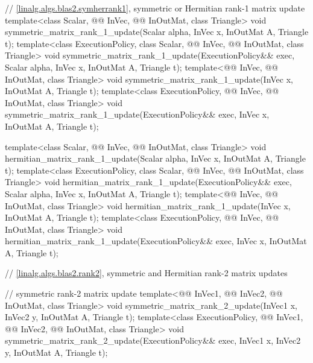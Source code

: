 \begin{codeblock}
{  // \ref{linalg.algs.blas2.symherrank1}, symmetric or Hermitian rank-1 matrix update
  template<class Scalar, @@ InVec, @@ InOutMat, class Triangle>
    void symmetric_matrix_rank_1_update(Scalar alpha, InVec x, InOutMat A, Triangle t);
  template<class ExecutionPolicy,
           class Scalar, @@ InVec, @@ InOutMat, class Triangle>
    void symmetric_matrix_rank_1_update(ExecutionPolicy&& exec,
                                        Scalar alpha, InVec x, InOutMat A, Triangle t);
  template<@@ InVec, @@ InOutMat, class Triangle>
    void symmetric_matrix_rank_1_update(InVec x, InOutMat A, Triangle t);
  template<class ExecutionPolicy,
           @@ InVec, @@ InOutMat, class Triangle>
    void symmetric_matrix_rank_1_update(ExecutionPolicy&& exec,
                                        InVec x, InOutMat A, Triangle t);

  template<class Scalar, @@ InVec, @@ InOutMat, class Triangle>
    void hermitian_matrix_rank_1_update(Scalar alpha, InVec x, InOutMat A, Triangle t);
  template<class ExecutionPolicy,
           class Scalar, @@ InVec, @@ InOutMat, class Triangle>
    void hermitian_matrix_rank_1_update(ExecutionPolicy&& exec,
                                        Scalar alpha, InVec x, InOutMat A, Triangle t);
  template<@@ InVec, @@ InOutMat, class Triangle>
    void hermitian_matrix_rank_1_update(InVec x, InOutMat A, Triangle t);
  template<class ExecutionPolicy,
           @@ InVec, @@ InOutMat, class Triangle>
    void hermitian_matrix_rank_1_update(ExecutionPolicy&& exec,
                                        InVec x, InOutMat A, Triangle t);

  // \ref{linalg.algs.blas2.rank2}, symmetric and Hermitian rank-2 matrix updates

  // symmetric rank-2 matrix update
  template<@@ InVec1, @@ InVec2,
           @@ InOutMat, class Triangle>
    void symmetric_matrix_rank_2_update(InVec1 x, InVec2 y, InOutMat A, Triangle t);
  template<class ExecutionPolicy, @@ InVec1, @@ InVec2,
           @@ InOutMat, class Triangle>
    void symmetric_matrix_rank_2_update(ExecutionPolicy&& exec,
                                        InVec1 x, InVec2 y, InOutMat A, Triangle t);

}
\end{codeblock}
